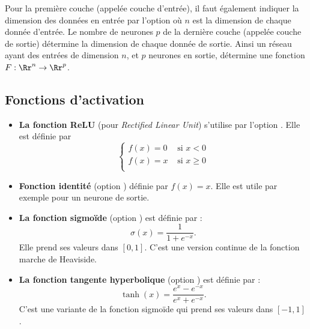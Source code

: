 \documentclass[11pt,class=report,crop=false]{standalone}
\begin{document}
Pour la première couche (appelée couche d'entrée), il faut également indiquer la dimension des données en entrée par l'option  où $n$ est la dimension de chaque donnée d'entrée.
Le nombre de neurones $p$ de la dernière couche (appelée couche de sortie) détermine la dimension de chaque donnée de sortie. Ainsi un réseau ayant des entrées de dimension $n$, et $p$ neurones en sortie, détermine une fonction $F : \Rr^n \to \Rr^p$.



\subsection{Fonctions d'activation}


\begin{itemize}
  \item \textbf{La fonction ReLU} (pour \emph{Rectified Linear Unit}) s'utilise par l'option . Elle est   définie par 
  $$\begin{cases}
  f(x) = 0 & \text{ si } x < 0 \\
  f(x) = x  & \text{ si } x \ge 0 \\
  \end{cases}$$

  \item \textbf{Fonction identité} (option ) définie par $f(x) = x$. Elle est utile par exemple pour un neurone de sortie.
  
  \item \textbf{La fonction sigmoïde} (option ) est définie par :
  $$\sigma(x) = \frac{1}{1+e^{-x}}.$$
  Elle prend ses valeurs dans $[0,1]$.
  C'est une version continue de la fonction marche de Heaviside.
    
  \item \textbf{La fonction tangente hyperbolique}
  (option ) est définie par :
  $$\tanh(x) = \frac{e^{x}-e^{-x}}{e^{x}+e^{-x}}.$$
  C'est une variante de la fonction sigmoïde qui prend ses valeurs dans $[-1,1]$.
  
\end{itemize}


\begin{minipage}{0.5\textwidth}
\end{minipage}
\begin{minipage}{0.45\textwidth}
\end{minipage}
\end{document}
